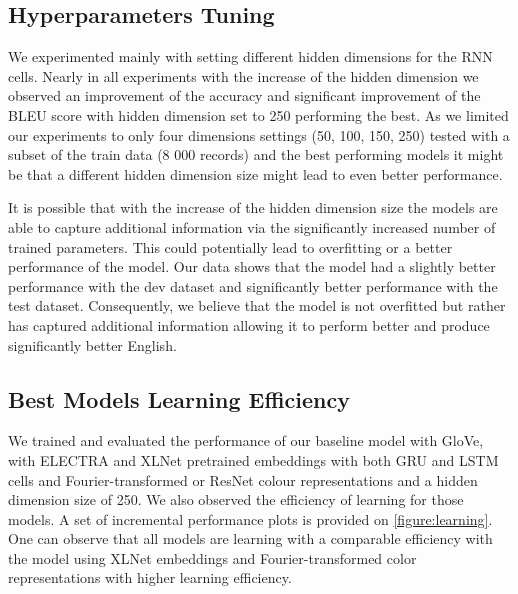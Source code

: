 \subsection{Hyperparameters Tuning}
We experimented mainly with setting different hidden dimensions for the RNN cells. Nearly in all experiments with the increase of the hidden dimension we observed an improvement of the accuracy and significant improvement of the BLEU score with hidden dimension set to 250 performing the best. As we limited our experiments to only four dimensions settings (50, 100, 150, 250) tested with a subset of the train data (8 000 records) and the best performing models it might be that a different hidden dimension size might lead to even better performance.

\par
It is possible that with the increase of the hidden dimension size the models are able to capture additional information via the significantly increased number of trained parameters. This could potentially lead to overfitting or a better performance of the model. Our data shows that the model had a slightly better performance with the dev dataset and significantly better performance with the test dataset. Consequently, we believe that the model is not overfitted but rather has captured additional information allowing it to perform better and produce significantly better English.

\subsection{Best Models Learning Efficiency}
We trained and evaluated the performance of our baseline model with GloVe, with ELECTRA and XLNet pretrained embeddings with both GRU and LSTM cells and Fourier-transformed or ResNet colour representations and a hidden dimension size of 250. We also observed the efficiency of learning for those models. A set of incremental performance plots is provided on \ref{figure:learning}. One can observe that all models are learning with a comparable efficiency with the model using XLNet embeddings and Fourier-transformed color representations with higher learning efficiency.

